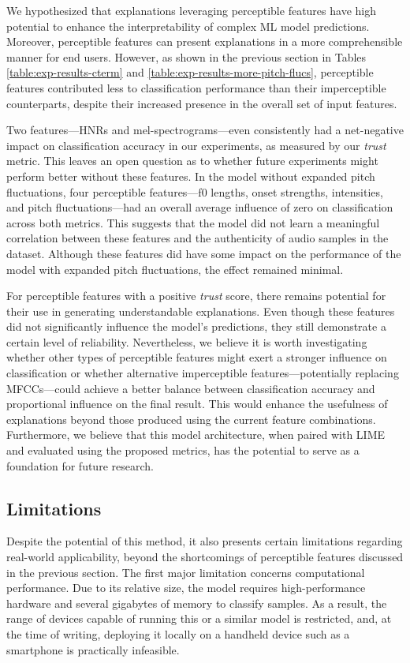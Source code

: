 \documentclass{article}
\begin{document}
We hypothesized that explanations leveraging perceptible features have high potential to enhance the interpretability of complex ML model predictions. Moreover, perceptible features can present explanations in a more comprehensible manner for end users. However, as shown in the previous section in Tables \ref{table:exp-results-cterm} and \ref{table:exp-results-more-pitch-flucs}, perceptible features contributed less to classification performance than their imperceptible counterparts, despite their increased presence in the overall set of input features.

Two features—HNRs and mel-spectrograms—even consistently had a net-negative impact on classification accuracy in our experiments, as measured by our \textit{trust} metric. This leaves an open question as to whether future experiments might perform better without these features. In the model without expanded pitch fluctuations, four perceptible features—f0 lengths, onset strengths, intensities, and pitch fluctuations—had an overall average influence of zero on classification across both metrics. This suggests that the model did not learn a meaningful correlation between these features and the authenticity of audio samples in the dataset. Although these features did have some impact on the performance of the model with expanded pitch fluctuations, the effect remained minimal.

For perceptible features with a positive \textit{trust} score, there remains potential for their use in generating understandable explanations. Even though these features did not significantly influence the model’s predictions, they still demonstrate a certain level of reliability. Nevertheless, we believe it is worth investigating whether other types of perceptible features might exert a stronger influence on classification or whether alternative imperceptible features—potentially replacing MFCCs—could achieve a better balance between classification accuracy and proportional influence on the final result. This would enhance the usefulness of explanations beyond those produced using the current feature combinations. Furthermore, we believe that this model architecture, when paired with LIME and evaluated using the proposed metrics, has the potential to serve as a foundation for future research.

\subsection{Limitations}
Despite the potential of this method, it also presents certain limitations regarding real-world applicability, beyond the shortcomings of perceptible features discussed in the previous section. The first major limitation concerns computational performance. Due to its relative size, the model requires high-performance hardware and several gigabytes of memory to classify samples. As a result, the range of devices capable of running this or a similar model is restricted, and, at the time of writing, deploying it locally on a handheld device such as a smartphone is practically infeasible.
\end{document}
